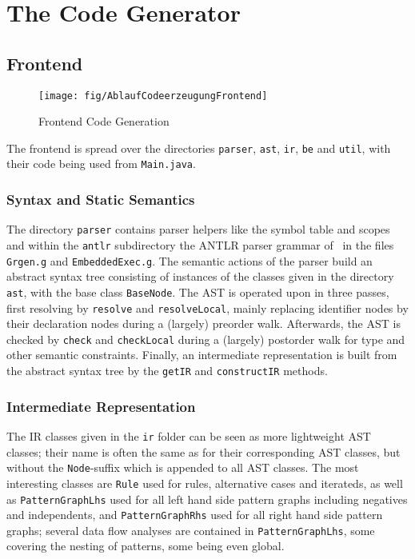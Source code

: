\section{The Code Generator}

\subsection{Frontend}

\begin{figure}[htbp]
  \centering
  \texttt{[image: fig/AblaufCodeerzeugungFrontend]}
  \caption{Frontend Code Generation}
  \label{figfrontendcodegen}
\end{figure}

The frontend is spread over the directories \texttt{parser}, \texttt{ast}, \texttt{ir}, \texttt{be} and \texttt{util}, with their code being used from \texttt{Main.java}.

\subsubsection*{Syntax and Static Semantics}
The directory \texttt{parser} contains parser helpers like the symbol table and scopes and within the \texttt{antlr} subdirectory the ANTLR parser grammar of \GrG~in the files \texttt{Grgen.g} and \texttt{EmbeddedExec.g}.
The semantic actions of the parser build an abstract syntax tree consisting of instances of the classes given in the directory \texttt{ast}, with the base class \texttt{BaseNode}.
The AST is operated upon in three passes, first resolving by \texttt{resolve} and \texttt{resolveLocal}, mainly replacing identifier nodes by their declaration nodes during a (largely) preorder walk.
Afterwards, the AST is checked by \texttt{check} and \texttt{checkLocal} during a (largely) postorder walk for type and other semantic constraints.
Finally, an intermediate representation is built from the abstract syntax tree by the \texttt{getIR} and \texttt{constructIR} methods.

\subsubsection*{Intermediate Representation}
The IR classes given in the \texttt{ir} folder can be seen as more lightweight AST classes; their name is often the same as for their corresponding AST classes, but without the \texttt{Node}-suffix which is appended to all AST classes.
The most interesting classes are \texttt{Rule} used for rules, alternative cases and iterateds, as well as \texttt{PatternGraphLhs} used for all left hand side pattern graphs including negatives and independents, and \texttt{PatternGraphRhs} used for all right hand side pattern graphs;
several data flow analyses are contained in \texttt{PatternGraphLhs}, some covering the nesting of patterns, some being even global.

